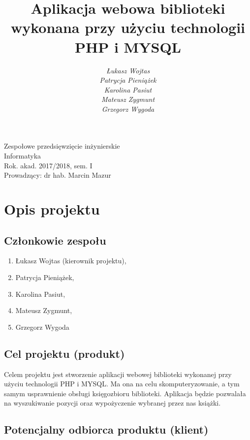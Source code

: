 \documentclass[a4paper]{article}
\title{\bf{Aplikacja webowa biblioteki wykonana przy użyciu technologii PHP i MYSQL}}
\author{{\em Łukasz Wojtas}\\{\em Patrycja Pieniążek}\\{\em Karolina Pasiut}\\{\em Mateusz Zygmunt}\\{\em Grzegorz Wygoda }}
\date{}
\begin{document}
\begin{titlepage}
\maketitle
\thispagestyle{empty}
\bigskip
\begin{center}
Zespołowe przedsięwzięcie inżynierskie\\[2mm]

Informatyka\\[2mm]

Rok. akad. 2017/2018, sem. I\\[2mm]

Prowadzący: dr hab. Marcin Mazur
\end{center}
\end{titlepage}

\tableofcontents
\thispagestyle{empty}

\newpage

\section{Opis projektu}

\subsection{Członkowie zespołu}

\begin{enumerate}
\item Łukasz Wojtas (kierownik projektu),
\item Patrycja Pieniążek,
\item Karolina Pasiut,
\item Mateusz Zygmunt,
\item Grzegorz Wygoda
\end{enumerate}

\subsection{Cel projektu (produkt)}

Celem projektu jest stworzenie aplikacji webowej biblioteki wykonanej przy użyciu technologii PHP i MYSQL. Ma ona na celu skomputeryzowanie, a tym samym usprawnienie obsługi księgozbioru biblioteki. Aplikacja będzie pozwalała na wyszukiwanie pozycji oraz wypożyczenie wybranej przez nas książki.

\subsection{Potencjalny odbiorca produktu (klient)}
\end{document}
